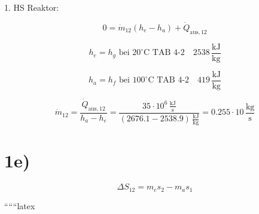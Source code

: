 1. HS Reaktor:

\[
0 = \dot{m}_{12} (h_e - h_a) + \dot{Q}_{\text{aus}, 12}
\]

\[
h_e = h_g \text{ bei } 20^\circ \text{C TAB 4-2} \quad 2538 \, \frac{\text{kJ}}{\text{kg}}
\]

\[
h_a = h_f \text{ bei } 100^\circ \text{C TAB 4-2} \quad 419 \, \frac{\text{kJ}}{\text{kg}}
\]

\[
\dot{m}_{12} = \frac{\dot{Q}_{\text{aus}, 12}}{h_a - h_e} = \frac{35 \cdot 10^6 \, \frac{\text{kJ}}{\text{s}}}{(2676.1 - 2538.9) \, \frac{\text{kJ}}{\text{kg}}} = 0.255 \cdot 10 \, \frac{\text{kg}}{\text{s}}
\]

\section*{1e)}

\[
\Delta S_{12} = m_e s_2 - m_a s_1
\]

``````latex


